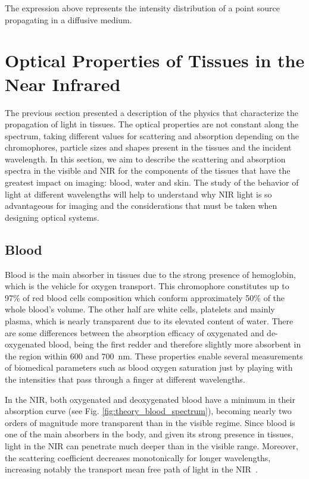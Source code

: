 The expression above represents the intensity distribution of a point source propagating in a diffusive medium.

\section{Optical Properties of Tissues in the Near Infrared}
\label{sec:2}
The previous section presented a description of the physics that characterize the propagation of light in tissues. The optical properties are not constant along the spectrum, taking different values for scattering and absorption depending on the chromophores, particle sizes and shapes present in the tissues and the incident wavelength. 
In this section, we aim to describe the scattering and absorption spectra in the visible and NIR for the components of the tissues that have the greatest impact on imaging: blood, water and skin. The study of the behavior of light at different wavelengths will help to understand why NIR light is so advantageous for imaging and the considerations that must be taken when designing optical systems.

\subsection{Blood}

Blood is the main absorber in tissues due to the strong presence of hemoglobin, which is the vehicle for oxygen transport. This chromophore constitutes up to 97\% of red blood cells composition which conform approximately 50\% of the whole blood's volume. The other half are white cells, platelets and mainly plasma, which is nearly transparent due to its elevated content of water.
There are some differences between the absorption efficacy of oxygenated and de-oxygenated blood, being the first redder and therefore slightly more absorbent in the region within 600 and \SI{700}{\nm}. These properties enable several measurements of biomedical parameters such as blood oxygen saturation just by playing with the intensities that pass through a finger at different wavelengths.

In the NIR, both oxygenated and deoxygenated blood have a minimum in their absorption curve (see Fig. \ref{fig:theory_blood_spectrum}), becoming nearly two orders of magnitude more transparent than in the visible regime. Since blood is one of the main absorbers in the body, and given its strong presence in tissues, light in the NIR can penetrate much deeper than in the visible range. Moreover, the scattering coefficient decreases monotonically for longer wavelengths, increasing notably the transport mean free path of light in the NIR~\cite{Bosschaart2014}.

